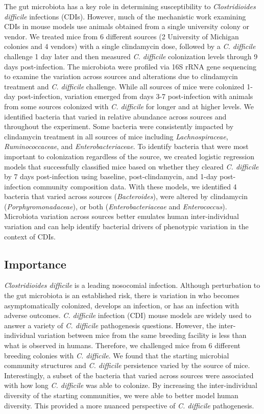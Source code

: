 \documentclass[
  11pt,
]{article}
\begin{document}
The gut microbiota has a key role in determining susceptibility to
\emph{Clostridioides difficile} infections (CDIs). However, much of the
mechanistic work examining CDIs in mouse models use animals obtained
from a single university colony or vendor. We treated mice from 6
different sources (2 University of Michigan colonies and 4 vendors) with
a single clindamycin dose, followed by a \emph{C. difficile} challenge 1
day later and then measured \emph{C. difficile} colonization levels
through 9 days post-infection. The microbiota were profiled via 16S rRNA
gene sequencing to examine the variation across sources and alterations
due to clindamycin treatment and \emph{C. difficile} challenge. While
all sources of mice were colonized 1-day post-infection, variation
emerged from days 3-7 post-infection with animals from some sources
colonized with \emph{C. difficile} for longer and at higher levels. We
identified bacteria that varied in relative abundance across sources and
throughout the experiment. Some bacteria were consistently impacted by
clindamycin treatment in all sources of mice including
\emph{Lachnospiraceae}, \emph{Ruminococcaceae}, and
\emph{Enterobacteriaceae}. To identify bacteria that were most important
to colonization regardless of the source, we created logistic regression
models that successfully classified mice based on whether they cleared
\emph{C. difficile} by 7 days post-infection using baseline,
post-clindamycin, and 1-day post-infection community composition data.
With these models, we identified 4 bacteria that varied across sources
(\emph{Bacteroides}), were altered by clindamycin
(\emph{Porphyromonadaceae}), or both (\emph{Enterobacteriaceae} and
\emph{Enterococcus}). Microbiota variation across sources better
emulates human inter-individual variation and can help identify
bacterial drivers of phenotypic variation in the context of CDIs.

\hypertarget{importance}{%
\subsection{Importance}\label{importance}}

\emph{Clostridioides difficile} is a leading nosocomial infection.
Although perturbation to the gut microbiota is an established risk,
there is variation in who becomes asymptomatically colonized, develops
an infection, or has an infection with adverse outcomes. \emph{C.
difficile} infection (CDI) mouse models are widely used to answer a
variety of \emph{C. difficile} pathogenesis questions. However, the
inter-individual variation between mice from the same breeding facility
is less than what is observed in humans. Therefore, we challenged mice
from 6 different breeding colonies with \emph{C. difficile}. We found
that the starting microbial community structures and \emph{C. difficile}
persistence varied by the source of mice. Interestingly, a subset of the
bacteria that varied across sources were associated with how long
\emph{C. difficile} was able to colonize. By increasing the
inter-individual diversity of the starting communities, we were able to
better model human diversity. This provided a more nuanced perspective
of \emph{C. difficile} pathogenesis.
\end{document}
